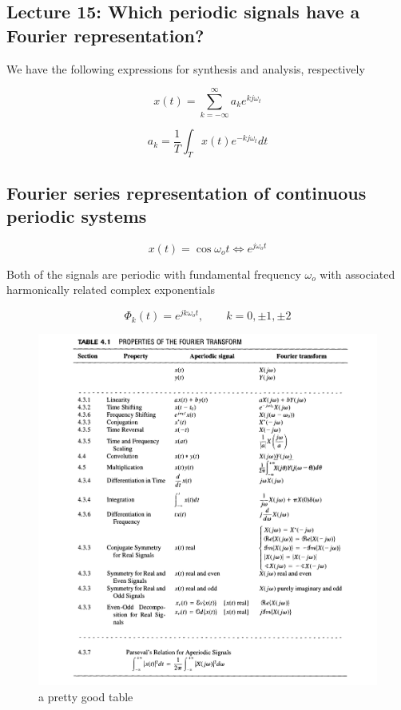 \documentclass[../notes.tex]{subfiles}
\begin{document}
\subsection{Lecture 15: Which periodic signals have a Fourier representation?}


We have the following expressions for synthesis and analysis, respectively

\begin{equation}
	x(t) = \sum_{k=-\infty}^{\infty} a_k e^{k j \omega_ t }
\end{equation}

\begin{equation}
	a_k = \frac{1}{T} \int_T x(t) e^{-k j \omega_ t } dt
\end{equation}





\subsection{Fourier series representation of continuous periodic systems}



\begin{equation}
	x(t) = \cos \omega_o t \Leftrightarrow e^{j\omega_o t}
\end{equation}

Both of the signals are periodic with fundamental frequency $ \omega_o $ with associated harmonically related complex exponentials


\begin{equation}
	\Phi_k(t) = e^{j k\omega_o t }, \qquad k = 0, \pm 1, \pm 2
\end{equation}







\begin{figure}[H]
	\centering
	\includegraphics[width=0.8\linewidth]{img/image_2022-11-02-16-50-54.png}
	\caption{a pretty good table}
\end{figure}
\end{document}
